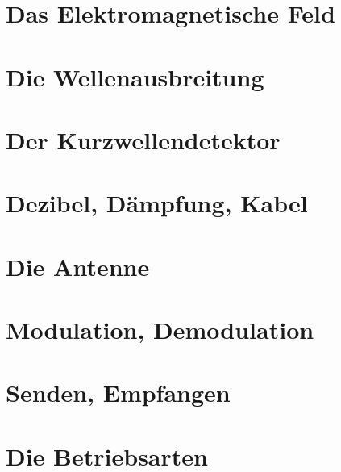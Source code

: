 \documentclass[ngerman, openany, twoside]{Script}
\begin{document}
\chapter{Das Elektromagnetische Feld}


\newpage \vspace*{5cm}
\newpage

\chapter{Die Wellenausbreitung}


\chapter{Der Kurzwellendetektor}


\chapter{Dezibel, Dämpfung, Kabel}


\newpage \vspace*{5cm}
\newpage

\chapter{Die Antenne}


\newpage \vspace*{5cm}
\newpage

\chapter{Modulation, Demodulation}


\newpage \vspace*{5cm}
\newpage

\chapter{Senden, Empfangen}


\newpage \vspace*{5cm}
\newpage

\chapter{Die Betriebsarten}

\end{document}
